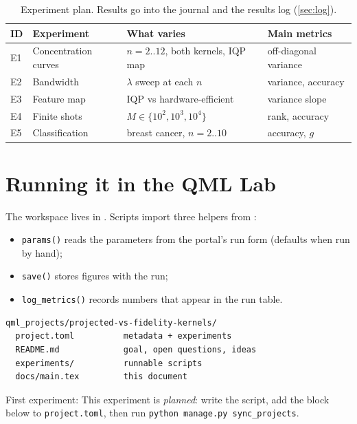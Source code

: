 \documentclass[11pt,a4paper]{article}
\begin{document}
\begin{table}[h]
\centering\small
\begin{tabularx}{\linewidth}{@{}l>{\raggedright}X>{\raggedright}X>{\raggedright\arraybackslash}X@{}}
\toprule
ID & Experiment & What varies & Main metrics \\
\midrule
  E1 & Concentration curves & $n=2..12$, both kernels, IQP map & off-diagonal variance \\
  E2 & Bandwidth & $\lambda$ sweep at each $n$ & variance, accuracy \\
  E3 & Feature map & IQP vs hardware-efficient & variance slope \\
  E4 & Finite shots & $M\in\{10^2,10^3,10^4\}$ & rank, accuracy \\
  E5 & Classification & breast cancer, $n=2..10$ & accuracy, $g$ \\
\bottomrule
\end{tabularx}
\caption{Experiment plan. Results go into the journal and the results log (\cref{sec:log}).}
\end{table}

\section{Running it in the QML Lab}
The workspace lives in . Scripts import three helpers from
:
\begin{itemize}
  \item \texttt{params()} reads the parameters from the portal's run form (defaults when run by hand);
  \item \texttt{save()} stores figures with the run;
  \item \texttt{log\_metrics()} records numbers that appear in the run table.
\end{itemize}

\begin{lstlisting}
qml_projects/projected-vs-fidelity-kernels/
  project.toml          metadata + experiments
  README.md             goal, open questions, ideas
  experiments/          runnable scripts
  docs/main.tex         this document
\end{lstlisting}

First experiment: This experiment is \emph{planned}: write the script, add the block below to \texttt{project.toml}, then run \texttt{python manage.py sync\_projects}.
\end{document}
